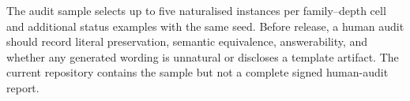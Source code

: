 The audit sample selects up to five naturalised instances per family--depth cell and additional
status examples with the same seed.  Before release, a human audit should record literal
preservation, semantic equivalence, answerability, and whether any generated wording is
unnatural or discloses a template artifact.  The current repository contains the sample but not
a complete signed human-audit report.
